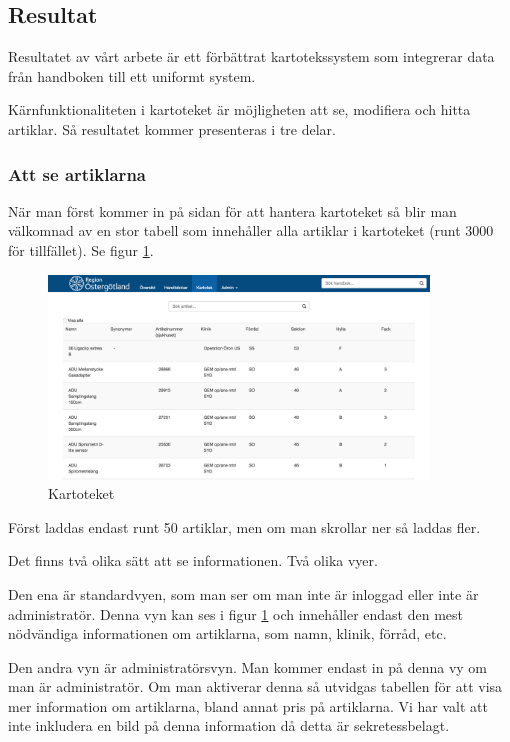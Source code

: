 \clearpage
\subsection{Resultat}
Resultatet av vårt arbete är ett förbättrat kartotekssystem
som integrerar data från handboken till ett uniformt system.

Kärnfunktionaliteten i kartoteket är möjligheten att se, modifiera och hitta artiklar.
Så resultatet kommer presenteras i tre delar.

\subsubsection{Att se artiklarna}
När man först kommer in på sidan för att hantera kartoteket så
blir man välkomnad av en stor tabell som innehåller alla artiklar
i kartoteket (runt 3000 för tillfället). Se figur \ref{fig:table}.

\begin{figure}[h!]
  \centering
  \includegraphics[width=0.9\textwidth]{../images/kartotek1.png}
  \caption{Kartoteket}
  \label{fig:table}
\end{figure}

Först laddas endast runt 50 artiklar, men
om man skrollar ner så laddas fler.

Det finns två olika sätt att se informationen.
Två olika vyer.

Den ena är standardvyen, som man ser om man inte är inloggad
eller inte är administratör. Denna vyn kan ses i figur \ref{fig:table}
och innehåller endast den mest nödvändiga informationen om
artiklarna, som namn, klinik, förråd, etc.

Den andra vyn är administratörsvyn.
Man kommer endast in på denna vy om man är administratör.
Om man aktiverar denna så utvidgas tabellen för att
visa mer information om artiklarna, bland annat pris på artiklarna.
Vi har valt att inte inkludera en bild på denna information
då detta är sekretessbelagt.

